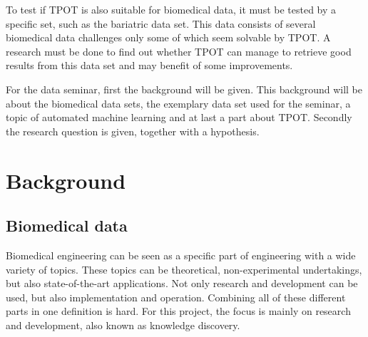 \documentclass[10pt,a4paper]{article}
\begin{document}
	To test if TPOT is also suitable for biomedical data, it must be tested by a specific set, such as the bariatric data set. This data consists of several biomedical data challenges only some of which seem solvable by TPOT. A research must be done to find out whether TPOT can manage to retrieve good results from this data set and may benefit of some improvements.
	
	For the data seminar, first the background will be given. This background will be about the biomedical data sets, the exemplary data set used for the seminar, a topic of automated machine learning and at last a part about TPOT. Secondly the research question is given, together with a hypothesis.
	
	\section{Background}
	\label{sec:Background}
	
	\subsection{Biomedical data}
	
	\label{subsec:BiomedicalData}
	
	Biomedical engineering can be seen as a specific part of engineering with a wide variety of topics. These topics can be theoretical, non-experimental undertakings, but also state-of-the-art applications. Not only research and development can be used, but also implementation and operation. Combining all of these different parts in one definition is hard. \cite{bronzino2014biomedical} For this project, the focus is mainly on research and development, also known as knowledge discovery. \cite{bramer2007principles} 
\end{document}
